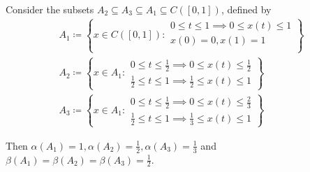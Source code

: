 \begin{example}\label{ex:noncompactness_measures}\cite[exercise 7.3]{Deimling1985}
  Consider the subsets \( A_2 \subseteq A_3 \subseteq A_1 \subseteq C([0, 1]) \), defined by
  \begin{align*}
    A_1 \coloneqq \left\{
      x \in C([0, 1]) \colon \begin{aligned}
        0 \leq t \leq 1 \implies 0 \leq x(t) \leq 1 \\
        x(0) = 0, x(1) = 1 \\
      \end{aligned}
    \right\}
    \\
    A_2 \coloneqq \left\{
      x \in A_1 \colon \begin{aligned}
        0 \leq t \leq \frac 1 2 \implies 0 \leq x(t) \leq \frac 1 2 \\
        \frac 1 2 \leq t \leq 1 \implies \frac 1 2 \leq x(t) \leq 1
      \end{aligned}
    \right\}
    \\
    A_3 \coloneqq \left\{
      x \in A_1 \colon \begin{aligned}
        0 \leq t \leq \frac 1 2 \implies 0 \leq x(t) \leq \frac 2 3 \\
        \frac 1 2 \leq t \leq 1 \implies \frac 1 3 \leq x(t) \leq 1
      \end{aligned}
    \right\}
  \end{align*}

  Then \( \alpha(A_1) = 1, \alpha(A_2) = \frac 1 2, \alpha(A_3) = \frac 1 3 \) and \( \beta(A_1) = \beta(A_2) = \beta(A_3) = \frac 1 2 \).
\end{example}
